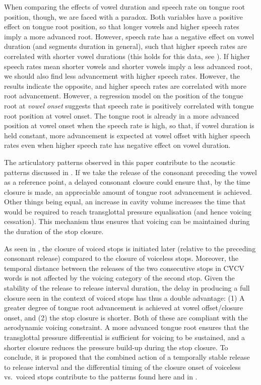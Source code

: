 \documentclass[12pt,]{article}
\begin{document}
When comparing the effects of vowel duration and speech rate on tongue
root position, though, we are faced with a paradox. Both variables have
a positive effect on tongue root position, so that longer vowels and
higher speech rates imply a more advanced root. However, speech rate has
a negative effect on vowel duration (and segments duration in general),
such that higher speech rates are correlated with shorter vowel
durations (this holds for this data, see \citealt{coretta2018j}). If
higher speech rates mean shorter vowels and shorter vowels imply a less
advanced root, we should also find less advancement with higher speech
rates. However, the results indicate the opposite, and higher speech
rates are correlated with more root advancement. However, a regression
model on the position of the tongue root at \emph{vowel onset} suggests
that speech rate is positively correlated with tongue root position at
vowel onset. The tongue root is already in a more advanced position at
vowel onset when the speech rate is high, so that, if vowel duration is
held constant, more advancement is expected at vowel offset with higher
speech rates even when higher speech rate has negative effect on vowel
duration.

The articulatory patterns observed in this paper contribute to the
acoustic patterns discussed in \citet{coretta2018j}. If we take the
release of the consonant preceding the vowel as a reference point, a
delayed consonant closure could ensure that, by the time closure is
made, an appreciable amount of tongue root advancement is achieved.
Other things being equal, an increase in cavity volume increases the
time that would be required to reach transglottal pressure equalisation
(and hence voicing cessation). This mechanism thus ensures that voicing
can be maintained during the duration of the stop closure.

As seen in \citet{coretta2018j}, the closure of voiced stops is
initiated later (relative to the preceding consonant release) compared
to the closure of voiceless stops. Moreover, the temporal distance
between the releases of the two consecutive stops in CV́CV words is not
affected by the voicing category of the second stop. Given the stability
of the release to release interval duration, the delay in producing a
full closure seen in the context of voiced stops has thus a double
advantage: (1) A greater degree of tongue root advancement is achieved
at vowel offset/closure onset, and (2) the stop closure is shorter. Both
of these are compliant with the aerodynamic voicing constraint. A more
advanced tongue root ensures that the transglottal pressure differential
is sufficient for voicing to be sustained, and a shorter closure reduces
the pressure build-up during the stop closure. To conclude, it is
proposed that the combined action of a temporally stable release to
release interval and the differential timing of the closure onset of
voiceless vs.~voiced stops contribute to the patterns found here and in
\citet{coretta2018j}.
\end{document}
